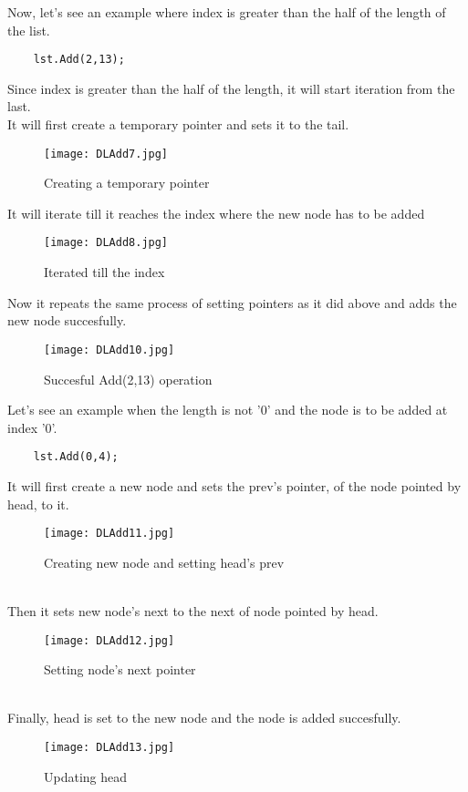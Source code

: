 \documentclass[11pt,fleqn]{book} %
\begin{document}
\begin{example}
  Now, let's see an example where index is greater than the half of the length of the list.\\
  \begin{lstlisting}
    lst.Add(2,13);
  \end{lstlisting}
  Since index is greater than the half of the length, it will start iteration from the last.\\
  It will first create a temporary pointer and sets it to the tail.
  \begin{figure}[H]
    \centering
    \texttt{[image: DLAdd7.jpg]}
    \caption{Creating a temporary pointer}
  \end{figure}
  It will iterate till it reaches the index where the new node has to be added
  \begin{figure}[H]
    \centering
    \texttt{[image: DLAdd8.jpg]}
    \caption{Iterated till the index}
  \end{figure}
  Now it repeats the same process of setting pointers as it did above and adds the new node succesfully.
  \begin{figure}[H]
    \centering
    \texttt{[image: DLAdd10.jpg]}
    \caption{Succesful Add(2,13) operation}
  \end{figure}
\end{example}
Let's see an example when the length is not '0' and the node is to be added at index '0'.
\begin{example}
  \begin{lstlisting}
    lst.Add(0,4);
  \end{lstlisting}
  It will first create a new node and sets the prev's pointer, of the node pointed by head, to it.
  \begin{figure}[H]
    \centering
    \texttt{[image: DLAdd11.jpg]}
    \caption{Creating new node and setting head's prev}
  \end{figure}~\\
  Then it sets new node's next to the next of node pointed by head.
  \begin{figure}[H]
    \centering
    \texttt{[image: DLAdd12.jpg]}
    \caption{Setting node's next pointer}
  \end{figure}~\\
  Finally, head is set to the new node and the node is added succesfully.
  \begin{figure}[H]
    \centering
    \texttt{[image: DLAdd13.jpg]}
    \caption{Updating head}
  \end{figure}
\end{example}
\end{document}
